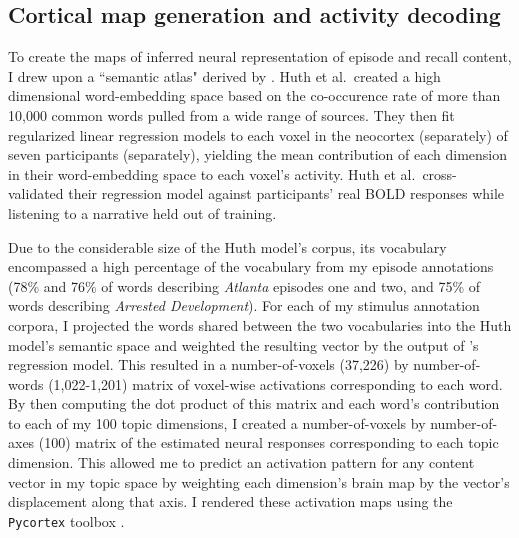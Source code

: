 \documentclass{article}
\begin{document}
\subsection*{Cortical map generation and activity decoding}\label{sec:brainmethods}
To create the maps of inferred neural representation of episode and recall content, I drew upon a ``semantic atlas" derived by \cite{HuthEtal16}.  Huth et al.~created a high dimensional word-embedding space based on the co-occurence rate of more than 10,000 common words pulled from a wide range of sources.  They then fit regularized linear regression models to each voxel in the neocortex (separately) of seven participants (separately), yielding the mean contribution of each dimension in their word-embedding space to each voxel's activity.  Huth et al.~cross-validated their regression model against participants' real BOLD responses while listening to a narrative held out of training.

Due to the considerable size of the Huth model's corpus, its vocabulary encompassed a high percentage of the vocabulary from my episode annotations (78\% and 76\% of words describing \textit{Atlanta} episodes one and two, and 75\% of words describing \textit{Arrested Development}).  For each of my stimulus annotation corpora, I projected the words shared between the two vocabularies into the Huth model's semantic space and weighted the resulting vector by the output of \cite{HuthEtal16}'s regression model.  This resulted in a number-of-voxels (37,226) by number-of-words (1,022-1,201) matrix of voxel-wise activations corresponding to each word.  By then computing the dot product of this matrix and each word's contribution to each of my 100 topic dimensions, I created a number-of-voxels by number-of-axes (100) matrix of the estimated neural responses corresponding to each topic dimension.  This allowed me to predict an activation pattern for any content vector in my topic space by weighting each dimension's brain map by the vector's displacement along that axis.  I rendered these activation maps using the \texttt{Pycortex} toolbox \citep{GaoEtal15}.
\end{document}
